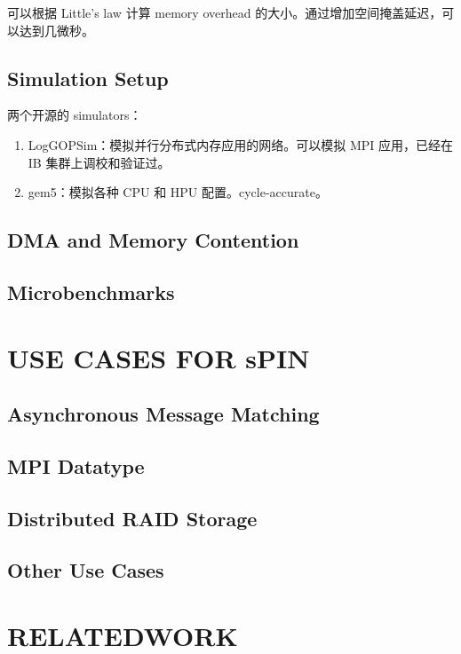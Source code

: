 \documentclass[cn,pad,11pt,green,geye]{../elegantnote}
\begin{document}
可以根据 Little’s law 计算 memory overhead 的大小。通过增加空间掩盖延迟，可以达到几微秒。

\subsection{Simulation Setup}
两个开源的 simulators：
\begin{enumerate}
   \item LogGOPSim：模拟并行分布式内存应用的网络。可以模拟 MPI 应用，已经在 IB 集群上调校和验证过。
   \item gem5：模拟各种 CPU 和 HPU 配置。cycle-accurate。
\end{enumerate}

\subsection{DMA and Memory Contention}

\subsection{Microbenchmarks}


\section{USE CASES FOR sPIN}

\subsection{Asynchronous Message Matching}

\subsection{MPI Datatype}

\subsection{Distributed RAID Storage}

\subsection{Other Use Cases}

\section{RELATEDWORK}
\end{document}
